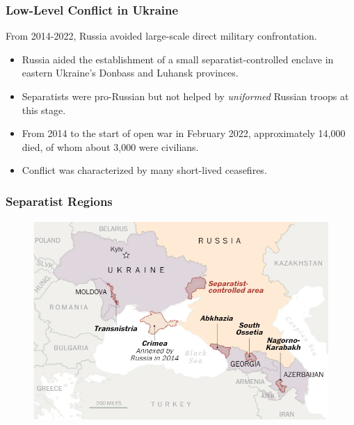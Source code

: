 \documentclass{beamer}
\begin{document}
\begin{frame} 
	\frametitle{\LARGE{Low-Level Conflict in Ukraine}}
	From 2014-2022, Russia avoided large-scale direct military confrontation.
	\begin{itemize}
		\item Russia aided the establishment of a small separatist-controlled enclave in eastern Ukraine's Donbass and Luhansk provinces. \pause
		\item Separatists were pro-Russian but not helped by \textit{uniformed} Russian troops at this stage. \pause
		\item From 2014 to the start of open war in February 2022, approximately 14,000 died, of whom about 3,000 were civilians. \pause
		\item Conflict was characterized by many short-lived ceasefires.
	\end{itemize}
\end{frame}

\begin{frame} 
	\frametitle{\LARGE{Separatist Regions}}
	\begin{figure}[ht!]
		\centering
		\includegraphics[width=\textwidth,height=\textheight, keepaspectratio]{sep1.png}
	\end{figure}
\end{frame}
\end{document}
